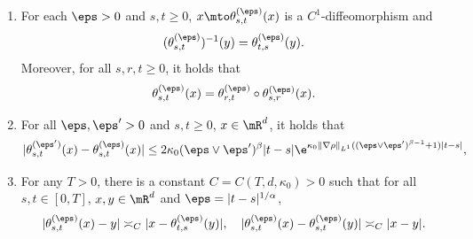 \skpt
\begin{lemma}\label{Le41}
\begin{enumerate}
\item For each $\eps>0$ and $s,t\geq 0$, $x\mto \theta^{(\eps)}_{s,t}(x)$ is a $C^1$-diffeomorphism and
\begin{equation}\label{Inv}
(\theta^{(\eps)}_{s,t})^{-1}(y)=\theta^{(\eps)}_{t,s}(y).
\end{equation}
Moreover, for all $s,r,t\geq 0$, it holds that
\begin{equation}\label{flow}
\theta^{(\eps)}_{s,t}(x)=\theta^{(\eps)}_{r,t}\circ\theta^{(\eps)}_{s,r}(x).
\end{equation}

\item For all $\eps,\eps'>0$ and $s,t\geq 0$, $x\in\mR^d$, it holds that
\begin{equation}\label{AQ4}
|\theta^{(\eps')}_{s,t}(x)-\theta^{(\eps)}_{s,t}(x)|\leq 2\kappa_0(\eps\vee\eps')^\beta
|t-s|\e^{\kappa_0\|\nabla\rho\|_{L^1}((\eps\vee\eps')^{\beta-1}+1)|t-s|},
\end{equation}

\item For any $T>0$, there is a constant $C=C(T,d,\kappa_0)>0$ such that for all $s,t\in[0,T]$, $x,y\in\mR^d$ and $\eps=|t-s|^{1/\alpha}$,
\begin{equation}\label{AQ3}
|\theta^{(\eps)}_{s,t}(x)-y|\asymp_C|x-\theta^{(\eps)}_{t,s}(y)|,\quad |\theta^{(\eps)}_{s,t}(x)-\theta^{(\eps)}_{s,t}(y)|\asymp_C|x-y|.
\end{equation}
\end{enumerate}
\end{lemma}
\skpt
